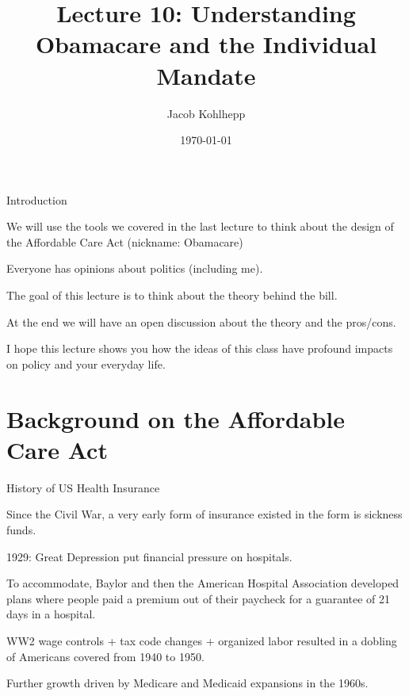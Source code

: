 \documentclass[aspectratio=169]{beamer}
\title[Obamacare]{Lecture 10: Understanding Obamacare and the Individual Mandate} %
\author{Jacob Kohlhepp} %
\institute[UCLA] %
{
Econ 101 \\ %
\medskip
}
\date{\today} %
\newenvironment{wideitemize}{\itemize\addtolength{\itemsep}{10pt}}{\enditemize}
\begin{document}
\begin{frame}
\titlepage %
\end{frame}

\begin{frame}{Introduction}
\begin{wideitemize}
    \item We will use the tools we covered in the last lecture to think about the design of the Affordable Care Act (nickname: Obamacare)
    \item Everyone has opinions about politics (including me).
    \item The goal of this lecture is to think about the theory behind the bill.
    \item At the end we will have an open discussion about the theory and the pros/cons.
    \item I hope this lecture shows you how the ideas of this class have profound impacts on policy and your everyday life.
\end{wideitemize}
\end{frame}
\section{Background on the Affordable Care Act}
\begin{frame}{History of US Health Insurance}
    \begin{wideitemize}
        \item Since the Civil War, a very early form of insurance existed in the form is sickness funds.
        \item 1929: Great Depression put financial pressure on hospitals. 
        \item To accommodate, Baylor and then the American Hospital Association developed plans where people paid a premium out of their paycheck for a guarantee of 21 days in a hospital.
        \item WW2 wage controls + tax code changes + organized labor resulted in a dobling of Americans covered from 1940 to 1950.
        \item Further growth driven by Medicare and Medicaid expansions in the 1960s.
    \end{wideitemize}
\end{frame}
\end{document}
